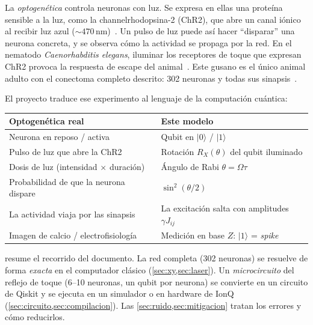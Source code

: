 \documentclass[11pt,a4paper]{article}
\renewcommand{\ket}[1]{\lvert #1\rangle}
\newcommand{\RX}{R_X}
\theoremstyle{plain}
\theoremstyle{definition}
\theoremstyle{remark}
\begin{document}
La \emph{optogenética} controla neuronas con luz. Se expresa en ellas una proteína sensible a la luz, como la channelrhodopsina-2 (ChR2), que abre un canal iónico al recibir luz azul ($\sim470$\,nm)~\cite{boyden2005}. Un pulso de luz puede así hacer ``disparar'' una neurona concreta, y se observa cómo la actividad se propaga por la red. En el nematodo \emph{Caenorhabditis elegans}, iluminar los receptores de toque que expresan ChR2 provoca la respuesta de escape del animal~\cite{nagel2005}. Este gusano es el único animal adulto con el conectoma completo descrito: 302 neuronas y todas sus sinapsis~\cite{white1986,cook2019}.

El proyecto traduce ese experimento al lenguaje de la computación cuántica:

\begin{center}
\renewcommand{\arraystretch}{1.25}
\begin{tabular}{@{}L{0.44\textwidth}L{0.48\textwidth}@{}}
\toprule
\textbf{Optogenética real} & \textbf{Este modelo} \\
\midrule
Neurona en reposo / activa & Qubit en $\ket{0}$ / $\ket{1}$ \\
Pulso de luz que abre la ChR2 & Rotación $\RX(\theta)$ del qubit iluminado \\
Dosis de luz (intensidad $\times$ duración) & Ángulo de Rabi $\theta=\Omega\tau$ \\
Probabilidad de que la neurona dispare & $\sin^2(\theta/2)$ \\
La actividad viaja por las sinapsis & La excitación salta con amplitudes $\gamma J_{ij}$ \\
Imagen de calcio / electrofisiología & Medición en base $Z$: $\ket{1}$ = \emph{spike} \\
\bottomrule
\end{tabular}
\end{center}

 resume el recorrido del documento. La red completa (302 neuronas) se resuelve de forma \emph{exacta} en el computador clásico (\cref{sec:xy,sec:laser}). Un \emph{microcircuito} del reflejo de toque (6--10 neuronas, un qubit por neurona) se convierte en un circuito de Qiskit y se ejecuta en un simulador o en hardware de IonQ (\cref{sec:circuito,sec:compilacion}). Las \cref{sec:ruido,sec:mitigacion} tratan los errores y cómo reducirlos.
\end{document}
